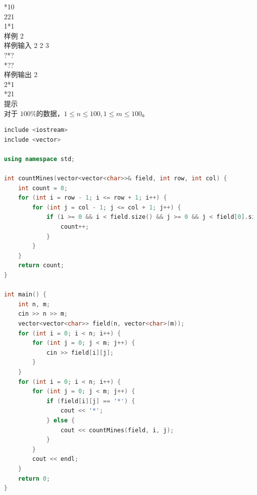 \documentclass[12pt,twiside,a4paper]{ctexbook}
\numberwithin{chapter}{part}
\begin{document}
*10\\
221\\
1*1\\
 样例 2\\
 样例输入 2
2 3\\
?*?\\
*??\\
 样例输出 2\\
2*1\\
*21\\
 提示\\
对于 $100\%$的数据，$1≤n≤100, 1≤m≤100$。
\begin{lstlisting}[language=c++]
include <iostream>
include <vector>

using namespace std;

int countMines(vector<vector<char>>& field, int row, int col) {
    int count = 0;
    for (int i = row - 1; i <= row + 1; i++) {
        for (int j = col - 1; j <= col + 1; j++) {
            if (i >= 0 && i < field.size() && j >= 0 && j < field[0].size() && field[i][j] == '*') {
                count++;
            }
        }
    }
    return count;
}

int main() {
    int n, m;
    cin >> n >> m;
    vector<vector<char>> field(n, vector<char>(m));
    for (int i = 0; i < n; i++) {
        for (int j = 0; j < m; j++) {
            cin >> field[i][j];
        }
    }
    for (int i = 0; i < n; i++) {
        for (int j = 0; j < m; j++) {
            if (field[i][j] == '*') {
                cout << '*';
            } else {
                cout << countMines(field, i, j);
            }
        }
        cout << endl;
    }
    return 0;
}
\end{lstlisting}
\end{document}
